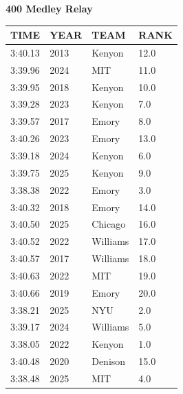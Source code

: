 \begin{table}[H]
\centering
\begin{minipage}[t]{0.6\textwidth}
\centering
\textbf{400 Medley Relay}\\[0.1cm]
\begin{tabular}{@{}p{1.8cm}p{1.2cm}p{1.4cm}p{0.8cm}@{}}
\hline
    \textbf{TIME} & \textbf{YEAR} & \textbf{TEAM} & \textbf{RANK} \\
\hline
    3:40.13 & 2013 & Kenyon & 12.0 \\
    3:39.96 & 2024 & MIT & 11.0 \\
    3:39.95 & 2018 & Kenyon & 10.0 \\
    3:39.28 & 2023 & Kenyon & 7.0 \\
    3:39.57 & 2017 & Emory & 8.0 \\
    3:40.26 & 2023 & Emory & 13.0 \\
    3:39.18 & 2024 & Kenyon & 6.0 \\
    3:39.75 & 2025 & Kenyon & 9.0 \\
    3:38.38 & 2022 & Emory & 3.0 \\
    3:40.32 & 2018 & Emory & 14.0 \\
    3:40.50 & 2025 & Chicago & 16.0 \\
    3:40.52 & 2022 & Williams & 17.0 \\
    3:40.57 & 2017 & Williams & 18.0 \\
    3:40.63 & 2022 & MIT & 19.0 \\
    3:40.66 & 2019 & Emory & 20.0 \\
    3:38.21 & 2025 & NYU & 2.0 \\
    3:39.17 & 2024 & Williams & 5.0 \\
    3:38.05 & 2022 & Kenyon & 1.0 \\
    3:40.48 & 2020 & Denison & 15.0 \\
    3:38.48 & 2025 & MIT & 4.0 \\
\hline
\end{tabular}
\end{minipage}
\end{table}

